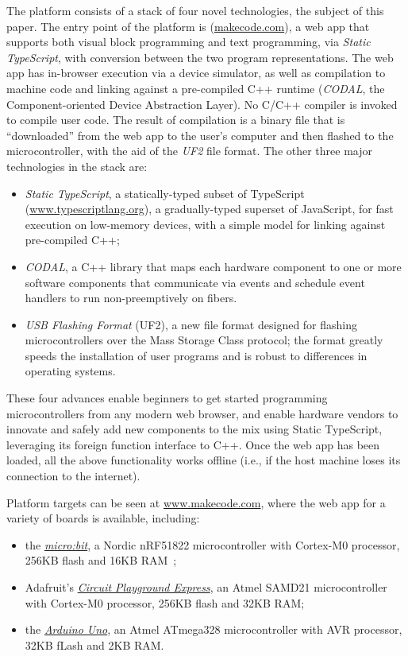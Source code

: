 The platform consists of a stack of four novel technologies, the subject of
this paper. The entry point of the platform is \emph{\MC} (\href{https://makecode.com}{makecode.com}),
a web app that supports both visual block programming and text programming,
via \emph{Static TypeScript}, with conversion 
between the two program representations. The web app has in-browser execution 
via a device simulator, as well as compilation to machine code and linking against a 
pre-compiled C++ runtime (\emph{CODAL}, the Component-oriented Device Abstraction Layer). No C/C++ compiler is invoked to compile user code. 
The result of compilation is a binary file that is ``downloaded'' from the web app to the user's 
computer and then flashed to the microcontroller, with the aid of the \emph{UF2} file format. The other three major technologies in the stack are:
\begin{itemize}

\item \emph{Static TypeScript}, a statically-typed subset of TypeScript (\url{www.typescriptlang.org}), 
a gradually-typed superset of JavaScript, for fast execution on low-memory devices, with
a simple model for linking against pre-compiled C++; 

\item \emph{CODAL}, a C++ library that maps 
each hardware component to one or more software components that communicate via events and
schedule event handlers to run non-preemptively on fibers. 

\item \emph{USB Flashing Format} (UF2), a new file format designed for flashing microcontrollers over the Mass Storage
Class protocol; the format greatly speeds the installation of user 
programs and is robust to differences in operating systems. 
\end{itemize}
These four advances enable beginners to get started programming microcontrollers from any modern web browser, and enable
hardware vendors to innovate and safely add new components to the mix using Static TypeScript, leveraging its
foreign function interface to C++. 
Once the web app has been loaded, 
all the above functionality works offline (i.e., if the host machine loses its connection 
to the internet).

Platform targets can be seen at \url{www.makecode.com}, where the \MC web app for a variety of boards is available, 
including:
\begin{itemize}
\item the \emph{\href{https://microbit.org}{micro:bit}}, a Nordic nRF51822 microcontroller with Cortex-M0 processor, 256KB flash and 16KB RAM~\cite{microbitICSE2016};
\item Adafruit's \emph{\href{https:/adafruit.com/products/3333}{Circuit Playground Express}}, an Atmel SAMD21 microcontroller with Cortex-M0 processor, 256KB flash and 32KB RAM;
\item the \emph{\href{https://store.arduino.cc/usa/arduino-uno-rev3}{Arduino Uno}}, an Atmel ATmega328 microcontroller with AVR processor, 32KB fLash and 2KB RAM.
\end{itemize}

